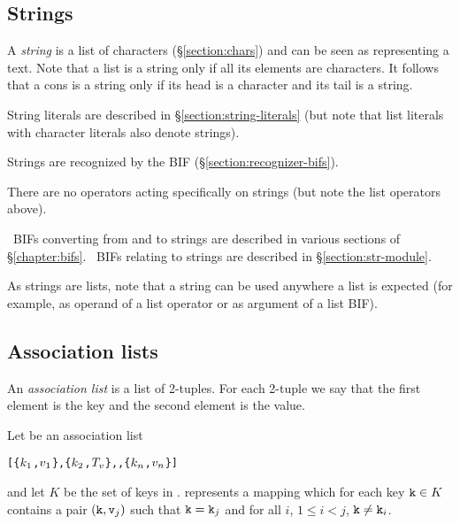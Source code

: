 \subsection{Strings}

\label{section:strings}

A \emph{string} is a list of characters
(\S\ref{section:chars}) and can be seen as representing a text.  Note
that a list is a string only if all its elements are characters.  It
follows that a cons is a string only if its head is a character and
its tail is a string.

String literals are described in \S\ref{section:string-literals}
(but note that list literals with character literals also denote strings).

\ifStd
Strings are recognized by the BIF 
(\S\ref{section:recognizer-bifs}).
\fi

There are no operators acting specifically on strings (but note the list
operators above).

\ifOld \Erlang\ BIFs converting from and to strings are described in
various sections of \S\ref{chapter:bifs}. \fi
\ifStd \Erlang\ BIFs relating to strings are described in
\S\ref{section:str-module}. \fi 

As strings are lists, note that a string can
be used anywhere a list is expected (for example, as operand of a list
operator or as argument of a list BIF).

\subsection{Association lists}

\label{section:assocationlists}

An \emph{association list} is a list of 2-tuples.  For each
2-tuple we say that the first element is the
key and the second element is the
value.

Let  be an association list
\begin{alltt}
[\{\(\Z{k}\sb{1}\),\(\Z{v}\sb{1}\)\},\{\(\Z{k}\sb{2}\),\(\Z{T}\sb{v}\)\},\tdots,\{\(\Z{k}\sb{n}\),\(\Z{v}\sb{n}\)\}]
\end{alltt}
and let $K$ be the set of keys in .   represents a mapping
which for each key ${\tt{\sl k}}\in K$ contains a pair $({\tt{\sl k}},{\tt{\sl v}}_j)$ such that
${\tt{\sl k}}={\tt{\sl k}}_j$ and for all $i$, $1\leq i<j$, ${\tt{\sl k}}\neq{\tt{\sl k}}_i$.

